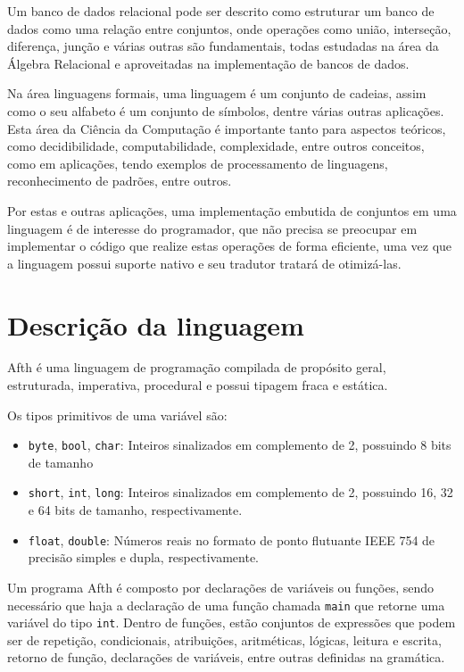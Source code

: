 \documentclass[
	article,			%
	11pt,				%
	oneside,			%
	a4paper,			%
	english,			%
	brazil,				%
	sumario=tradicional
	]{abntex2}
\begin{document}
Um banco de dados relacional pode ser descrito como estruturar um banco de dados
como uma relação entre conjuntos, onde operações como união, interseção, diferença,
junção e várias outras são fundamentais, todas estudadas na área da Álgebra Relacional
e aproveitadas na implementação de bancos de dados.

Na área linguagens formais, uma linguagem é um conjunto de cadeias, assim como o
seu alfabeto é um conjunto de símbolos, dentre várias outras aplicações. Esta área
da Ciência da Computação é importante tanto para aspectos teóricos, como decidibilidade,
computabilidade, complexidade, entre outros conceitos, como em aplicações, tendo exemplos
de processamento de linguagens, reconhecimento de padrões, entre outros.

Por estas e outras aplicações, uma implementação embutida de conjuntos em uma linguagem
é de interesse do programador, que não precisa se preocupar em implementar o código
que realize estas operações de forma eficiente, uma vez que a linguagem possui
suporte nativo e seu tradutor tratará de otimizá-las.

\section{Descrição da linguagem}

Afth é uma linguagem de programação compilada de propósito geral, estruturada, imperativa,
procedural e possui tipagem fraca e estática.

Os tipos primitivos de uma variável são:

\begin{itemize}
	\item \texttt{byte}, \texttt{bool}, \texttt{char}: Inteiros sinalizados em
	      complemento de 2, possuindo 8 bits de tamanho
	\item \texttt{short}, \texttt{int}, \texttt{long}: Inteiros sinalizados em
	      complemento de 2, possuindo 16, 32 e 64 bits de tamanho, respectivamente.
	\item \texttt{float}, \texttt{double}: Números reais no formato de ponto
	      flutuante IEEE 754 de precisão simples e dupla, respectivamente.
\end{itemize}

Um programa Afth é composto por declarações de variáveis ou funções, sendo necessário
que haja a declaração de uma função chamada \texttt{main} que retorne uma variável do tipo
\texttt{int}. Dentro de funções, estão conjuntos de expressões que podem ser de repetição,
condicionais, atribuições, aritméticas, lógicas, leitura e escrita, retorno de função,
declarações de variáveis, entre outras definidas na gramática.
\end{document}
